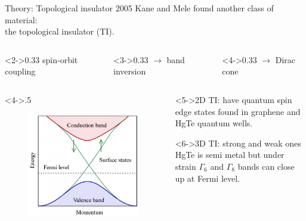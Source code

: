 \begin{frame}{Theory: Topological insulator}
	2005 Kane and Mele found another class of material: \\the topological insulator (TI).
	\\
	\begin{columns}
		\begin{column}<2->{0.33\linewidth}
			spin-orbit coupling
		\end{column}
		\hspace{-1cm}
		\begin{column}<3->{0.33\linewidth}
			$\rightarrow$ band inversion
		\end{column}
		\hspace{-1.2cm}
		\begin{column}<4->{0.33\linewidth}
			$\rightarrow$ Dirac cone
		\end{column}
	\end{columns}
	\begin{columns}
		\begin{column}<4->{.5\linewidth}
			\begin{figure}
				\includegraphics[width=\textwidth]{andere_bilder/band_structure_top_insulator}
			\end{figure}
		\end{column}
		\begin{column}{.5\linewidth}
			\begin{block}<5->{2D TI: }
			have quantum spin edge states found in graphene and HgTe quantum wells.
			\end{block}
			\begin{block}<6->{3D TI: }
			strong and weak ones \\
			HgTe is semi metal but under strain $\Gamma_6$ and $\Gamma_8$ bands can close up at Fermi level. 
			\end{block}
		\end{column}
	\end{columns}
\end{frame}

